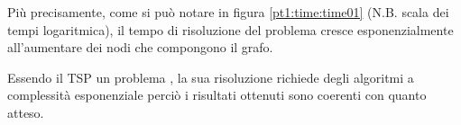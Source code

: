 Più precisamente, come si può notare in figura \ref{pt1:time:time01} (N.B. scala dei tempi logaritmica), il tempo di risoluzione del problema cresce esponenzialmente all'aumentare dei nodi che compongono il grafo.

Essendo il TSP un problema , la sua risoluzione richiede degli algoritmi a complessità esponenziale perciò i risultati ottenuti sono coerenti con quanto atteso.